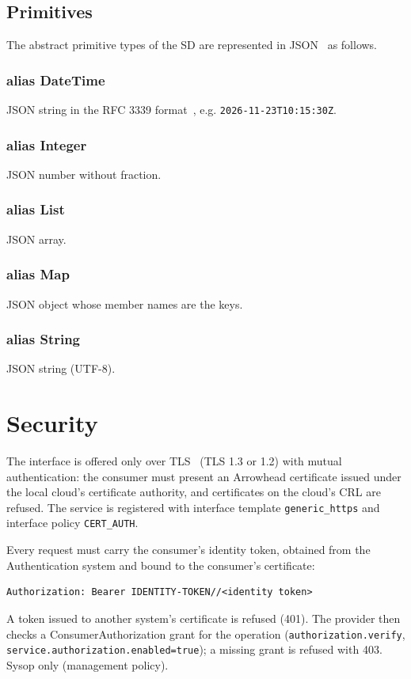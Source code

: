 \documentclass[a4paper]{arrowhead}
\newcommand{\pdef}[1]{{\textcolor{ArrowheadGrey}{#1\label{sec:model:primitives:#1}\label{sec:model:primitives:#1s}}}}
\begin{document}
\subsection{Primitives}
\label{sec:model:primitives}
The abstract primitive types of the SD are represented in JSON~\cite{rfc8259} as follows.
\subsubsection*{alias \pdef{DateTime}}
JSON string in the RFC 3339 format~\cite{rfc3339}, e.g. \texttt{2026-\allowbreak{}11-\allowbreak{}23T10:15:30Z}.

\subsubsection*{alias \pdef{Integer}}
JSON number without fraction.

\subsubsection*{alias \pdef{List}}
JSON array.

\subsubsection*{alias \pdef{Map}}
JSON object whose member names are the keys.

\subsubsection*{alias \pdef{String}}
JSON string (UTF-8).



\section{Security}
\label{sec:security}
The interface is offered only over TLS~\cite{rfc8446} (TLS 1.3 or 1.2) with mutual authentication: the consumer must
present an Arrowhead certificate issued under the local cloud's certificate authority, and certificates on the
cloud's CRL are refused. The service is registered with interface template \texttt{generic\_\allowbreak{}https} and interface
policy \texttt{CERT\_AUTH}.

Every request must carry the consumer's identity token, obtained from the Authentication system and bound to the
consumer's certificate:
\begin{lstlisting}
Authorization: Bearer IDENTITY-TOKEN//<identity token>
\end{lstlisting}
A token issued to another system's certificate is refused (401). The provider then checks a ConsumerAuthorization
grant for the operation (\texttt{authorization.\allowbreak{}verify}, \texttt{service.\allowbreak{}authorization.\allowbreak{}enabled=\allowbreak{}true}); a missing grant is
refused with 403. Sysop only (management policy).
\end{document}
